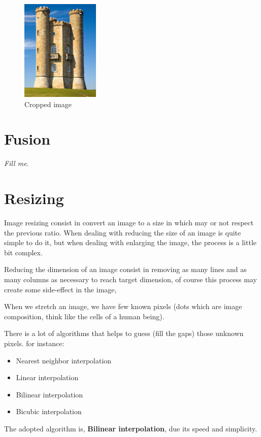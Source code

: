 \documentclass{article}
\begin{document}
	\begin{figure} [H]
		\centering
		\includegraphics[scale=1]{images/crop_2}
		\caption{Cropped image \label{crop_2}}
	\end{figure}

\section{Fusion}

	\textit{Fill me}.

\section{Resizing}

	Image resizing consist in convert an image to a size in which may or not respect the previous ratio.
	When dealing with reducing the size of an image is quite simple to do it, but when dealing with enlarging 
	the image, the process is a little bit complex.

	Reducing the dimension of an image consist in removing as many lines and as many columns as necessary to reach target dimension, of course this
	process may create some side-effect in the image, 

	When we stretch an image, we have few known pixels (dots which are image composition, think like the cells of a human being).

	There is a lot of algorithms that helps to guess (fill the gaps) those unknown pixels. for instance:

	\begin{itemize}
	  \item Nearest neighbor interpolation
	  \item Linear interpolation
	  \item Bilinear interpolation
	  \item Bicubic interpolation
	\end{itemize}

	The adopted algorithm is, \textbf{Bilinear interpolation},  due its speed and simplicity.
	
\end{document}
